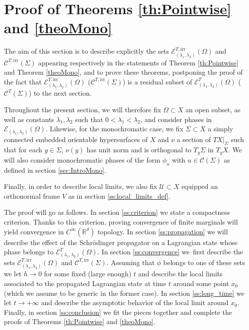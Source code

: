 \documentclass[10pt]{amsart}
\let\mathcal\mathscr
\newcommand{\irr}{\mathrm{irr}}
\theoremstyle{plain}
\theoremstyle{definition}
\newcommand{\R}{\mathbb{R}}
\def\calC{\mathcal{C}}
\def\calE{\mathcal{E}}
\def\calU{\mathcal{U}}
\begin{document}
\section{Proof of Theorems \ref{th:Pointwise} and \ref{theoMono}}\label{sec:MainProof}
The aim of this section is to describe explicitly the sets $\mathcal{E}^{T,\irr}_{(\lambda_1,\lambda_2)}(\Omega)$ and $\calC^{T,\irr}(\Sigma)$ appearing respectively in the statements of Theorem \ref{th:Pointwise} and Theorem \ref{theoMono}, and to prove these theorems, postponing the proof of the fact that $\mathcal{E}^{T,\irr}_{(\lambda_1,\lambda_2)}(\Omega)$ (\resp $\calC^{T,\irr}(\Sigma)$) is a residual subset of $\mathcal{E}^{T}_{(\lambda_1,\lambda_2)}(\Omega)$ (\resp $\calC^{T}(\Sigma)$) to the next section.

Throughout the present section, we will therefore fix $\Omega\subset X$ an open subset, as well as constants $\lambda_1,\lambda_2$ such that $0<\lambda_1<\lambda_2$, and consider phases in $\calE_{(\lambda_1,\lambda_2)}(\Omega)$. Likewise, for the monochromatic case, we fix $\Sigma\subset X$ a simply connected embedded orientable hypersurfaces of $X$ and $\nu$ a section of $TX|_\Sigma$ such that for each $y\in\Sigma$, $\nu(y)$ has unit norm and is orthogonal to $T_y\Sigma$ in $T_yX$. We will also consider monochromatic phases of the form $\phi_u$ with $u\in\calC(\Sigma)$ as defined in section \ref{sec:IntroMono}.

Finally, in order to describe local limits, we also fix $\calU\subset X$ equipped an orthonormal frame $V$ as in section \ref{ss:local_limits_def}.

The proof will go as follows. In section \ref{ss:criterion} we state a compactness criterion. Thanks to this criterion, proving convergence of finite marginals will yield convergence in $C^\infty(\R^d)$ topology. In section \ref{ss:propagation} we will describe the effect of the Schrödinger propagator on a Lagrangian state whose phase belongs to $\calE^T_{(\lambda_1,\lambda_2)}(\Omega)$. In section \ref{ss:convergence} we~first describe the sets $\calE^{T,\irr}_{(\lambda_1,\lambda_2)}(\Omega)$ and $\calC^{T,\irr}(\Sigma)$. Assuming that $\phi$ belongs to one of these sets we let $h\to 0$ for some fixed (large enough) $t$ and describe the local limits associated to the propagated Lagrangian state at time $t$ around some point $x_0$ (which we assume to be generic in the former case). In section \ref{ss:long_time} we let $t\to+\infty$ and describe the asymptotic behavior of the local limit around $x_0$. Finally, in section \ref{ss:conclusion} we fit the pieces together and complete the proofs of Theorems \ref{th:Pointwise} and \ref{theoMono}.
\end{document}
